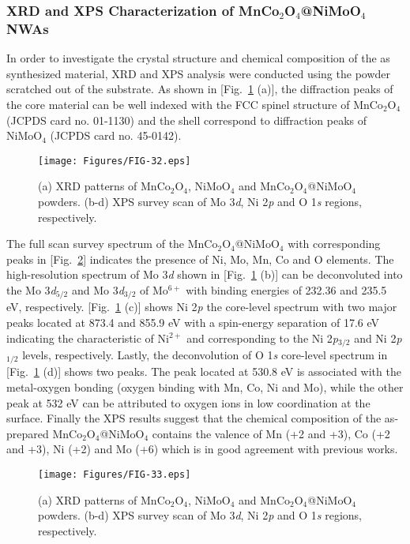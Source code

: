 \documentclass[reprint,amsmath,amssymb,aps,floatfix,
]{revtex4-2}
\begin{document}
\subsubsection{XRD and XPS Characterization of MnCo$_2$O$_4$@NiMoO$_4$ NWAs}
In order to investigate the crystal structure and chemical composition of the as synthesized material, XRD and XPS analysis were conducted using the powder scratched out of the substrate. As shown in [Fig.~\ref{fig:fig32} (a)], the diffraction peaks of the core material can be well indexed with the FCC spinel structure of MnCo$_2$O$_4$  (JCPDS card no. 01-1130) and the shell correspond to diffraction peaks of NiMoO$_4$ (JCPDS card no. 45-0142).\cite{Yan2016}
\begin{figure}[t]
    \centering
    \texttt{[image: Figures/FIG-32.eps]}
    \caption{\label{fig:fig32}(a) XRD patterns of MnCo$_2$O$_4$, NiMoO$_4$ and MnCo$_2$O$_4$@NiMoO$_4$ powders. (b-d) XPS survey scan of Mo 3{\it d}, Ni 2{\it p} and O 1{\it s} regions, respectively.}
    \end{figure}
The full scan survey spectrum of the MnCo$_2$O$_4$@NiMoO$_4$ with corresponding peaks in [Fig.~\ref{fig:fig33}] indicates the presence of Ni, Mo, Mn, Co and O elements. The high-resolution spectrum of Mo 3{\it d} shown in [Fig.~\ref{fig:fig32} (b)] can be deconvoluted into the Mo 3{\it d}$_{5/2}$ and Mo 3{\it d}$_{3/2}$ of Mo$^{6+}$ with binding energies of 232.36 and 235.5 eV, respectively.\cite{Owusu2017} [Fig.~\ref{fig:fig32} (c)] shows Ni 2{\it p} the core-level spectrum with two major peaks located at 873.4 and 855.9 eV with a spin-energy separation of 17.6 eV indicating the characteristic of Ni$^{2+}$ and corresponding to the Ni 2{\it p}$_{3/2}$ and Ni 2{\it p}$_{1/2}$ levels, respectively.\cite{Kang2015} Lastly, the deconvolution of O 1{\it s} core-level spectrum in [Fig.~\ref{fig:fig32} (d)] shows two peaks. The peak located at 530.8 eV is associated with the metal-oxygen bonding (oxygen binding with Mn, Co, Ni and Mo), while the other peak at 532 eV can be attributed to oxygen ions in low coordination at the surface.\cite{Socratous2015} Finally the XPS results suggest that the chemical composition of the as-prepared MnCo$_2$O$_4$@NiMoO$_4$ contains the valence of Mn (+2 and +3), Co (+2 and +3), Ni (+2) and Mo (+6) which is in good agreement with previous works.
\begin{figure}[t]
    \centering
    \texttt{[image: Figures/FIG-33.eps]}
    \caption{\label{fig:fig33}(a) XRD patterns of MnCo$_2$O$_4$, NiMoO$_4$ and MnCo$_2$O$_4$@NiMoO$_4$ powders. (b-d) XPS survey scan of Mo 3{\it d}, Ni 2{\it p} and O 1{\it s} regions, respectively.}
    \end{figure}
\end{document}
